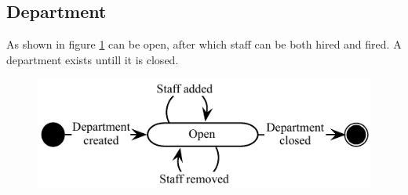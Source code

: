 \subsection{Department}
As shown in figure \ref{fig:Klasse_diagram_department} can be open, after which staff can be both hired and fired. A department exists untill it is closed.
\begin{figure}[H]
\begin{center}
\includegraphics[scale=1]{input/problem_domain_analysis/klassediagram_department.pdf}
\label{fig:Klasse_diagram_department}
\end{center}
\end{figure}